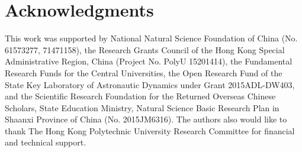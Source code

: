 \documentclass[preprint,review,10pt,round,authoryear]{elsarticle}\usepackage[]{graphicx}\usepackage[]{color}
\theoremstyle{plain}
\theoremstyle{definition}
\theoremstyle{remark}
\begin{document}
\def\ack{\section*{Acknowledgments}%
}
\ack{This work was supported by National Natural Science Foundation of China (No. 61573277, 71471158), the Research Grants Council of the Hong Kong Special Administrative Region, China (Project No. PolyU 15201414), the Fundamental Research Funds for the Central Universities, the Open Research Fund of the State Key Laboratory of Astronautic Dynamics under Grant 2015ADL-DW403, and the Scientific Research Foundation for the Returned Overseas Chinese Scholars, State Education Ministry, Natural Science Basic Research Plan in Shaanxi Province of China (No. 2015JM6316). The authors also would like to thank The Hong Kong Polytechnic University Research Committee for financial and technical support.}



\end{document}
